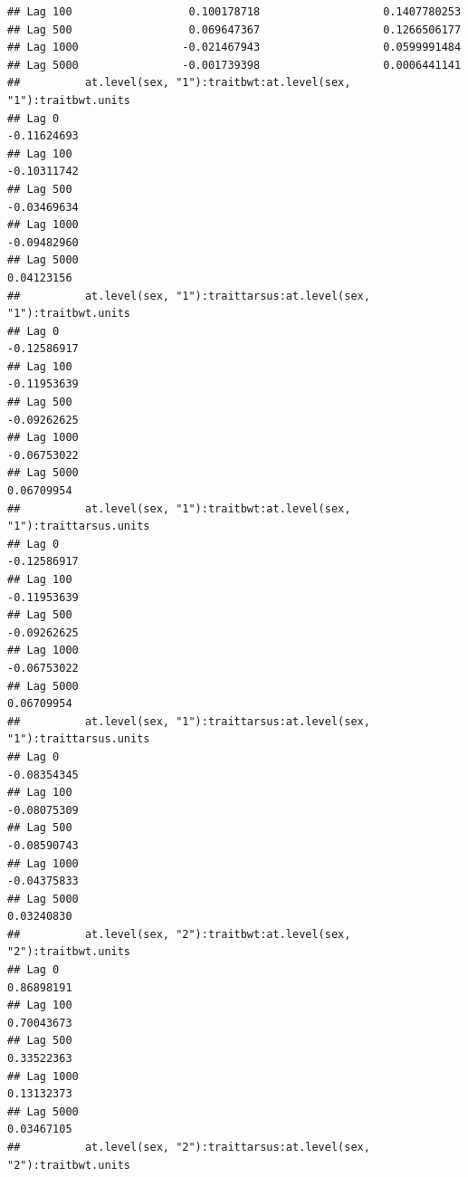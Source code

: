 \documentclass[
  12pt,
]{book}
\begin{document}
\begin{verbatim}
## Lag 100                  0.100178718                   0.1407780253
## Lag 500                  0.069647367                   0.1266506177
## Lag 1000                -0.021467943                   0.0599991484
## Lag 5000                -0.001739398                   0.0006441141
##          at.level(sex, "1"):traitbwt:at.level(sex, "1"):traitbwt.units
## Lag 0                                                      -0.11624693
## Lag 100                                                    -0.10311742
## Lag 500                                                    -0.03469634
## Lag 1000                                                   -0.09482960
## Lag 5000                                                    0.04123156
##          at.level(sex, "1"):traittarsus:at.level(sex, "1"):traitbwt.units
## Lag 0                                                         -0.12586917
## Lag 100                                                       -0.11953639
## Lag 500                                                       -0.09262625
## Lag 1000                                                      -0.06753022
## Lag 5000                                                       0.06709954
##          at.level(sex, "1"):traitbwt:at.level(sex, "1"):traittarsus.units
## Lag 0                                                         -0.12586917
## Lag 100                                                       -0.11953639
## Lag 500                                                       -0.09262625
## Lag 1000                                                      -0.06753022
## Lag 5000                                                       0.06709954
##          at.level(sex, "1"):traittarsus:at.level(sex, "1"):traittarsus.units
## Lag 0                                                            -0.08354345
## Lag 100                                                          -0.08075309
## Lag 500                                                          -0.08590743
## Lag 1000                                                         -0.04375833
## Lag 5000                                                          0.03240830
##          at.level(sex, "2"):traitbwt:at.level(sex, "2"):traitbwt.units
## Lag 0                                                       0.86898191
## Lag 100                                                     0.70043673
## Lag 500                                                     0.33522363
## Lag 1000                                                    0.13132373
## Lag 5000                                                    0.03467105
##          at.level(sex, "2"):traittarsus:at.level(sex, "2"):traitbwt.units

\end{verbatim}
\end{document}
